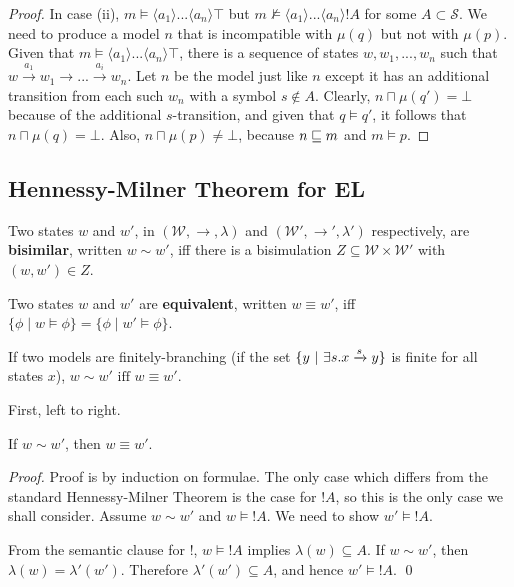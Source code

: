 \begin{proof}
In case (ii), $m \models \langle a_1 \rangle ... \langle a_n \rangle \top$ but $m \nvDash \langle a_1 \rangle ... \langle a_n \rangle !A$ for some $A \subset \mathcal{S}$. We need to produce a model $n$ that is incompatible with $\mu(q)$ but not with $\mu(p)$. Given that $m \models \langle a_1 \rangle ... \langle a_n \rangle \top$, there is a sequence of states $w, w_1, ..., w_n$ such that $w \xrightarrow{a_1} w_1 \rightarrow ... \xrightarrow{a_i} w_n$. Let $n$ be the model just like $n$ except it has an additional transition from each such $w_n$ with a symbol $s \notin A$. Clearly, $n \sqcap \mu(q') = \bot$ because of the additional $s$-transition, and given that $q \models q'$, it follows that $n \sqcap \mu(q) = \bot$. Also, $n \sqcap \mu(p) \neq \bot$, because $n \sqsubseteq m$ and $m \models p$.


\end{proof}

\subsection{Hennessy-Milner Theorem for EL}

\begin{definition}
Two states $w$ and $w'$, in $(\mathcal{W}, \rightarrow, \lambda)$ and $(\mathcal{W}', \rightarrow', \lambda')$ respectively, are {\bf bisimilar}, written $w \sim w'$, iff there is a bisimulation $Z \subseteq  \mathcal{W} \times \mathcal{W}'$ with $(w,w') \in Z$.
\end{definition}

\begin{definition}
Two states $w$ and $w'$ are {\bf equivalent}, written $w \equiv w'$, iff $\{\phi \; | \; w \models \phi\} = \{\phi \; | \; w' \models \phi\}$.
\end{definition}
\begin{theorem}
If two models are finitely-branching (if the set $\{y \ | \  \exists s . x \xrightarrow{s} y\}$ is finite for all states $x$), $w \sim w' \mbox{ iff } w \equiv w' $.
\end{theorem}
First, left to right.
\begin{case}
If $w \sim w'$, then $w \equiv w'$.
\end{case}
\begin{proof}
Proof is by induction on formulae.
The only case which differs from the standard Hennessy-Milner Theorem is the case for $!A$, so this is the only case we shall consider.
Assume $w \sim w'$ and $w \models !A$. We need to show $w' \models !A$.

From the semantic clause for $!$,  $w \models !A$ implies $\lambda(w) \subseteq A$.
If $w \sim w'$, then $\lambda(w) = \lambda'(w')$.
Therefore $\lambda'(w') \subseteq A$, and hence $w' \models !A$.
\qed
\end{proof}

